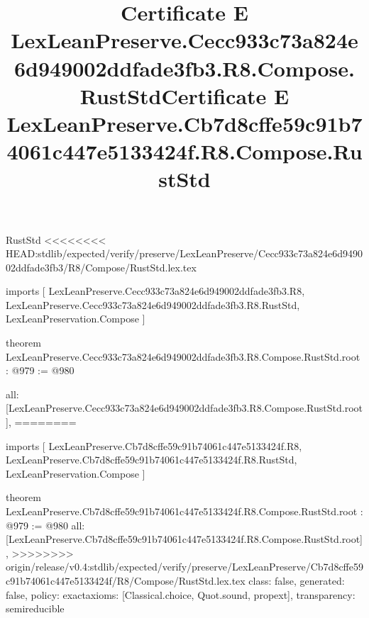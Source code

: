 \begin{lexlean}{RustStd}
<<<<<<<< HEAD:stdlib/expected/verify/preserve/LexLeanPreserve/Cecc933c73a824e6d949002ddfade3fb3/R8/Compose/RustStd.lex.tex
\title{Certificate E LexLeanPreserve.Cecc933c73a824e6d949002ddfade3fb3.R8.Compose.RustStd}
\begin{coremodule}
imports [
  LexLeanPreserve.Cecc933c73a824e6d949002ddfade3fb3.R8,
  LexLeanPreserve.Cecc933c73a824e6d949002ddfade3fb3.R8.RustStd,
  LexLeanPreservation.Compose
]

theorem LexLeanPreserve.Cecc933c73a824e6d949002ddfade3fb3.R8.Compose.RustStd.root : @979 := @980 {
  all: [LexLeanPreserve.Cecc933c73a824e6d949002ddfade3fb3.R8.Compose.RustStd.root],
========
\title{Certificate E LexLeanPreserve.Cb7d8cffe59c91b74061c447e5133424f.R8.Compose.RustStd}
\begin{coremodule}
imports [
  LexLeanPreserve.Cb7d8cffe59c91b74061c447e5133424f.R8,
  LexLeanPreserve.Cb7d8cffe59c91b74061c447e5133424f.R8.RustStd,
  LexLeanPreservation.Compose
]

theorem LexLeanPreserve.Cb7d8cffe59c91b74061c447e5133424f.R8.Compose.RustStd.root : @979 := @980 {
  all: [LexLeanPreserve.Cb7d8cffe59c91b74061c447e5133424f.R8.Compose.RustStd.root],
>>>>>>>> origin/release/v0.4:stdlib/expected/verify/preserve/LexLeanPreserve/Cb7d8cffe59c91b74061c447e5133424f/R8/Compose/RustStd.lex.tex
  class: false,
  generated: false,
  policy: exact{axioms: [Classical.choice, Quot.sound, propext]},
  transparency: semireducible
}


\end{coremodule}}
\end{coremodule}
\end{lexlean}
